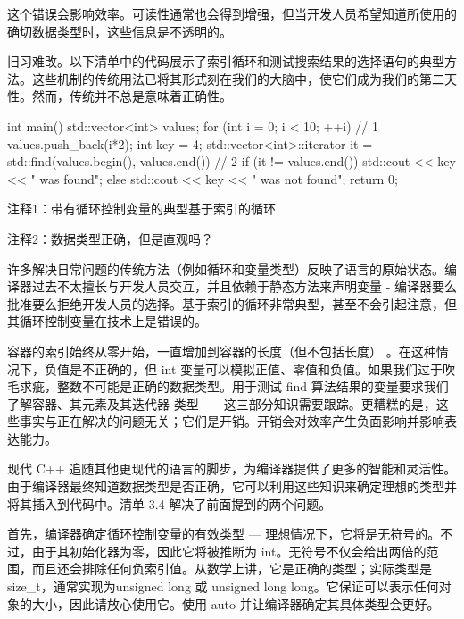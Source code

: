 这个错误会影响效率。可读性通常也会得到增强，但当开发人员希望知道所使用的确切数据类型时，这些信息是不透明的。


旧习难改。以下清单中的代码展示了索引循环和测试搜索结果的选择语句的典型方法。这些机制的传统用法已将其形式刻在我们的大脑中，使它们成为我们的第二天性。然而，传统并不总是意味着正确性。


\begin{cpp}
int main() {
  std::vector<int> values;
  for (int i = 0; i < 10; ++i) // 1
    values.push_back(i*2);
  int key = 4;
  std::vector<int>::iterator it =
  std::find(values.begin(), values.end()) // 2
  if (it != values.end())
    std::cout << key << " was found\n";
  else
    std::cout << key << " was not found\n";
  return 0;
}
\end{cpp}

{\footnotesize
注释1：带有循环控制变量的典型基于索引的循环

注释2：数据类型正确，但是直观吗？
}


许多解决日常问题的传统方法（例如循环和变量类型）反映了语言的原始状态。编译器过去不太擅长与开发人员交互，并且依赖于静态方法来声明变量 - 编译器要么批准要么拒绝开发人员的选择。基于索引的循环非常典型，甚至不会引起注意，但其循环控制变量在技术上是错误的。

容器的索引始终从零开始，一直增加到容器的长度（但不包括长度） 。在这种情况下，负值是不正确的，但 int 变量可以模拟正值、零值和负值。如果我们过于吹毛求疵，整数不可能是正确的数据类型。用于测试 find 算法结果的变量要求我们了解容器、其元素及其迭代器 类型——这三部分知识需要跟踪。更糟糕的是，这些事实与正在解决的问题无关；它们是开销。开销会对效率产生负面影响并影响表达能力。


现代 C++ 追随其他更现代的语言的脚步，为编译器提供了更多的智能和灵活性。由于编译器最终知道数据类型是否正确，它可以利用这些知识来确定理想的类型并将其插入到代码中。清单 3.4 解决了前面提到的两个问题。

首先，编译器确定循环控制变量的有效类型 — 理想情况下，它将是无符号的。不过，由于其初始化器为零，因此它将被推断为 int。无符号不仅会给出两倍的范围，而且还会排除任何负索引值。从数学上讲，它是正确的类型；实际类型是 size\_t，通常实现为unsigned long 或 unsigned long long。它保证可以表示任何对象的大小，因此请放心使用它。使用 auto 并让编译器确定其具体类型会更好。

